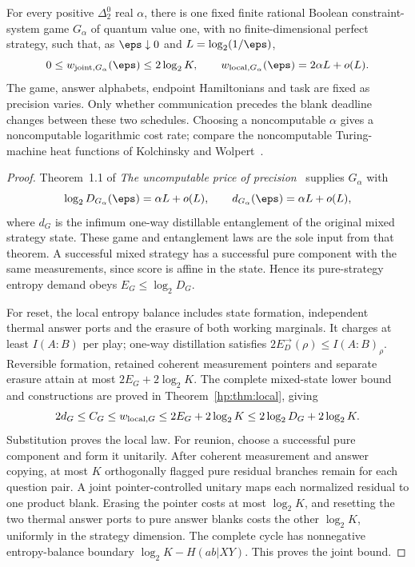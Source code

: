 \begin{corollary}\label{cor:precision-deadline}
For every positive $\Delta^0_2$ real $\alpha$, there is one fixed finite rational Boolean constraint-system game $G_\alpha$ of quantum value one, with no finite-dimensional perfect strategy, such that, as $\eps\downarrow0$ and $L=\log_2(1/\eps)$,
\begin{equation}\label{eq:precision-deadline}
 0\le w_{{\rm joint},G_\alpha}(\eps)\le2\log_2K,
 \qquad
 w_{{\rm local},G_\alpha}(\eps)=2\alpha L+o(L).
\end{equation}
The game, answer alphabets, endpoint Hamiltonians and task are fixed as precision varies. Only whether communication precedes the blank deadline changes between these two schedules. Choosing a noncomputable $\alpha$ gives a noncomputable logarithmic cost rate; compare the noncomputable Turing-machine heat functions of Kolchinsky and Wolpert~\cite{HPKW20}.
\end{corollary}
\begin{proof}
Theorem~1.1 of \emph{The uncomputable price of precision}~\cite{HPuncomputable} supplies $G_\alpha$ with
\[
 \log_2 D_{G_\alpha}(\eps)=\alpha L+o(L),\qquad
 d_{G_\alpha}(\eps)=\alpha L+o(L),
\]
where $d_G$ is the infimum one-way distillable entanglement of the original mixed strategy state. These game and entanglement laws are the sole input from that theorem. A successful mixed strategy has a successful pure component with the same measurements, since score is affine in the state. Hence its pure-strategy entropy demand obeys $E_G\le\log_2D_G$.

For reset, the local entropy balance includes state formation, independent thermal answer ports and the erasure of both working marginals. It charges at least $I(A:B)$ per play; one-way distillation satisfies $2E_D^{\to}(\rho)\le I(A:B)_\rho$. Reversible formation, retained coherent measurement pointers and separate erasure attain at most $2E_G+2\log_2K$. The complete mixed-state lower bound and constructions are proved in Theorem~\ref{hp:thm:local}, giving
\[
 2d_G\le C_G\le w_{{\rm local},G}\le2E_G+2\log_2K\le2\log_2D_G+2\log_2K.
\]
Substitution proves the local law. For reunion, choose a successful pure component and form it unitarily. After coherent measurement and answer copying, at most $K$ orthogonally flagged pure residual branches remain for each question pair. A joint pointer-controlled unitary maps each normalized residual to one product blank. Erasing the pointer costs at most $\log_2K$, and resetting the two thermal answer ports to pure answer blanks costs the other $\log_2K$, uniformly in the strategy dimension. The complete cycle has nonnegative entropy-balance boundary $\log_2K-H(ab|XY)$. This proves the joint bound.
\end{proof}

